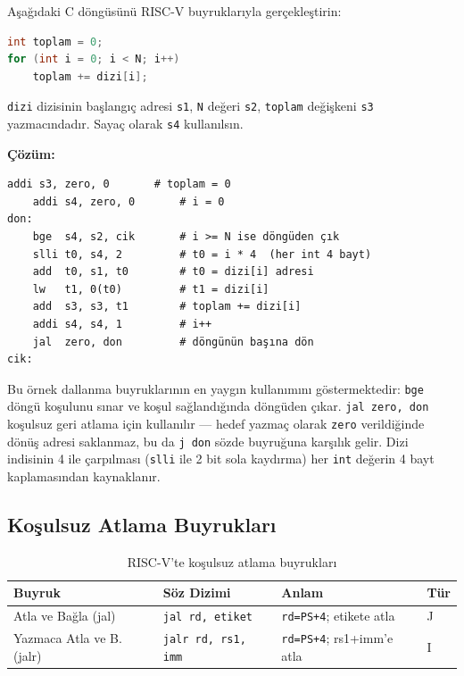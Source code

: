 \begin{ornek}[3.16]
\label{orn:dongu}
Aşağıdaki C döngüsünü RISC-V buyruklarıyla gerçekleştirin:
\begin{lstlisting}[language=C]
int toplam = 0;
for (int i = 0; i < N; i++)
    toplam += dizi[i];
\end{lstlisting}
\texttt{dizi} dizisinin başlangıç adresi \texttt{s1}, \texttt{N} değeri \texttt{s2}, \texttt{toplam} değişkeni \texttt{s3} yazmacındadır. Sayaç olarak \texttt{s4} kullanılsın.

\textbf{Çözüm:}
\begin{lstlisting}[style=riscv]
    addi s3, zero, 0       # toplam = 0
    addi s4, zero, 0       # i = 0
don:
    bge  s4, s2, cik       # i >= N ise döngüden çık
    slli t0, s4, 2         # t0 = i * 4  (her int 4 bayt)
    add  t0, s1, t0        # t0 = dizi[i] adresi
    lw   t1, 0(t0)         # t1 = dizi[i]
    add  s3, s3, t1        # toplam += dizi[i]
    addi s4, s4, 1         # i++
    jal  zero, don         # döngünün başına dön
cik:
\end{lstlisting}

Bu örnek dallanma buyruklarının en yaygın kullanımını göstermektedir: \texttt{bge} döngü koşulunu sınar ve koşul sağlandığında döngüden çıkar. \texttt{jal zero, don} koşulsuz geri atlama için kullanılır --- hedef yazmaç olarak \texttt{zero} verildiğinde dönüş adresi saklanmaz, bu da \texttt{j don} sözde buyruğuna karşılık gelir. Dizi indisinin 4 ile çarpılması (\texttt{slli} ile 2 bit sola kaydırma) her \texttt{int} değerin 4 bayt kaplamasından kaynaklanır.
\end{ornek}

\subsection{Koşulsuz Atlama Buyrukları}

\begin{table}[H]
\centering
\caption{RISC-V'te koşulsuz atlama buyrukları}
\label{tab:atlama-buyruklar}
\begin{tabular}{llll}
\toprule
\textbf{Buyruk} & \textbf{Söz Dizimi} & \textbf{Anlam} & \textbf{Tür} \\
\midrule
Atla ve Bağla (jal)   & \texttt{jal rd, etiket}     & \texttt{rd=PS+4}; etikete atla    & J \\
Yazmaca Atla ve B. (jalr) & \texttt{jalr rd, rs1, imm} & \texttt{rd=PS+4}; rs1+imm'e atla & I \\
\bottomrule
\end{tabular}
\end{table}

